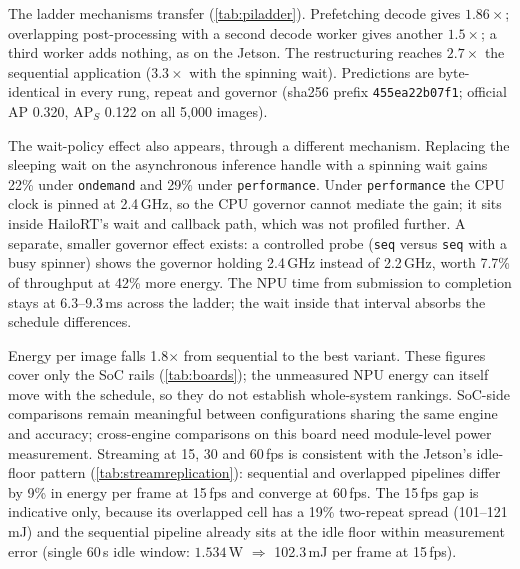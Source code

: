 The ladder mechanisms transfer (\cref{tab:piladder}). Prefetching
decode gives $1.86\times$; overlapping post-processing with a second
decode worker gives another $1.5\times$; a third worker adds nothing,
as on the Jetson. The restructuring reaches $2.7\times$ the sequential
application ($3.3\times$ with the spinning wait). Predictions are
byte-identical in every rung, repeat and governor (sha256 prefix
\texttt{455ea22b07f1}; official AP 0.320, AP$_S$ 0.122 on all 5,000
images).

The wait-policy effect also appears, through a different mechanism.
Replacing the sleeping wait on the asynchronous inference handle with
a spinning wait gains 22\% under \texttt{ondemand} and 29\% under
\texttt{performance}. Under \texttt{performance} the CPU clock is
pinned at 2.4\,GHz, so the CPU governor cannot mediate the gain; it
sits inside HailoRT's wait and callback path, which was not profiled
further. A separate, smaller governor effect exists: a controlled
probe (\texttt{seq} versus \texttt{seq} with a busy spinner) shows the
governor holding 2.4\,GHz instead of 2.2\,GHz, worth 7.7\% of
throughput at 42\% more energy. The NPU time from submission to
completion stays at 6.3--9.3\,ms across the ladder; the wait inside
that interval absorbs the schedule differences.

Energy per image falls 1.8$\times$ from sequential to the best variant.
These figures cover only the SoC rails (\cref{tab:boards}); the
unmeasured NPU energy can itself move with the schedule, so they do
not establish whole-system rankings. SoC-side
comparisons remain meaningful between configurations sharing the same
engine and accuracy; cross-engine comparisons on this board need
module-level power measurement. Streaming at 15, 30 and 60\,fps is
consistent with the Jetson's idle-floor pattern
(\cref{tab:streamreplication}): sequential and overlapped pipelines
differ by 9\% in energy per frame at 15\,fps and converge at 60\,fps.
The 15\,fps gap is indicative only, because its overlapped cell has a
19\% two-repeat spread (101--121\,mJ) and the sequential pipeline
already sits at the idle floor within measurement error (single 60\,s
idle window: $1.534$\,W $\Rightarrow$ 102.3\,mJ per frame at 15\,fps).

